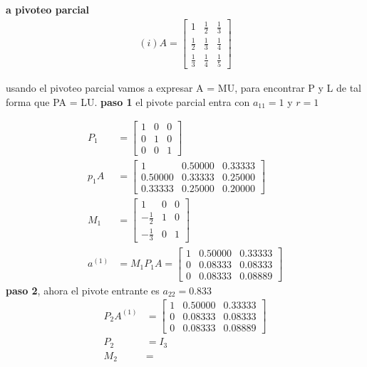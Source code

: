 \begin{enumerate}
\textbf{a pivoteo parcial}
\begin{align*}
	(i) A =
\begin{bmatrix}
1 &\frac{1}{2} &\frac{1}{3} \\[6pt]
\frac{1}{2} &\frac{1}{3} &\frac{1}{4} \\[6pt]
\frac{1}{3} &\frac{1}{4} &\frac{1}{5} 
\end{bmatrix}
\end{align*}

	usando el pivoteo parcial vamos a expresar A = MU, para encontrar P y L de tal forma que PA = LU.
	\textbf{paso 1} el pivote parcial entra con $a_{11}= 1$ y $r = 1$
	
	\begin{align*}
		P_{1} &= 
		\begin{bmatrix}
			1 &0 &0\\
			0 &1 &0\\
			0 &0 &1		
		\end{bmatrix}\\
		p_{1}A&=
		\begin{bmatrix}
			 1   &0.50000   &0.33333\\
   			 0.50000   &0.33333   &0.25000\\
  			 0.33333   &0.25000   &0.20000
		\end{bmatrix}\\
		M_1 &=
		\begin{bmatrix}
			1 &0 &0\\
			-\frac{1}{2} &1 &0\\
			-\frac{1}{3} &0 &1			
		\end{bmatrix}\\
		a^{ ( 1 ) } &=M_1P_1A = 
		\begin{bmatrix}
			1   &0.50000   &0.33333\\
		   0   &0.08333   &0.08333\\
		   0   &0.08333   &0.08889		
		\end{bmatrix}
	\end{align*}
	\textbf{paso 2}, ahora el pivote entrante es $a_{22} = 0.833$
	\begin{align*}
		P_2A^{( 1 )} &= 
		\begin{bmatrix}
			1   &0.50000   &0.33333\\
		   0   &0.08333   &0.08333\\
		   0   &0.08333   &0.08889
		\end{bmatrix}
		\\ P_2 &= I_3\\
		M_2 &= 

\end{align*}
\end{enumerate}
